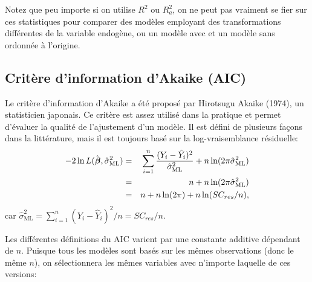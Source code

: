 Notez que peu importe si on utilise $R^2$ ou $R^2_{a}$, on ne peut pas vraiment se fier sur ces statistiques pour comparer des modèles employant des transformations différentes de la variable endogène, ou un modèle avec et un modèle sans ordonnée à l'origine.


\subsection{Critère d'information d'Akaike (AIC)}





Le critère d'information d'Akaike a été proposé par Hirotsugu Akaike (1974), un
statisticien japonais. Ce critère est assez utilisé dans la pratique et permet d'évaluer
la qualité de l'ajustement d'un modèle. Il est défini de plusieurs façons dans la littérature, mais il est toujours basé sur la log-vraisemblance résiduelle:
\begin{eqnarray*}
-2\ln L(\hat{\mbox{\boldmath$\beta$}},\hat\sigma^2_{\text{ML}}) & = & \sum_{i=1}^n\frac{(Y_i-\hat Y_i)^2}{\hat\sigma^2_{\text{ML}}}+n\ln(2\pi\hat\sigma^2_{\text{ML}}) \\
& = & n+n\ln(2\pi\hat\sigma^2_{\text{ML}}) \\
& = & n+n\ln(2\pi)+n\ln(SC_{res}/n),
\end{eqnarray*}
car $\hat\sigma^2_{\text{ML}}=\sum_{i=1}^n(Y_i-\hat Y_i)^2/n=SC_{res}/n.$


Les différentes définitions du AIC varient par une constante additive dépendant de $n$. Puisque tous les modèles sont basés sur les mêmes observations (donc le même $n$), on sélectionnera les mêmes variables avec n'importe laquelle de ces versions:

